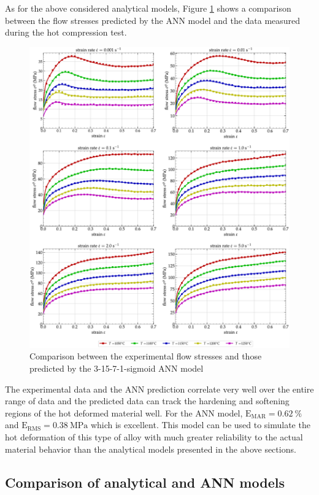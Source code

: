 \documentclass[metals,article,submit,pdftex,moreauthors]{Definitions/mdpi}
\DeclareRobustCommand{\RMSE}{\text{E}_\text{RMS}}
\DeclareRobustCommand{\MARE}{\text{E}_\text{MAR}}
\DeclareRobustCommand{\MPa}{\text{MPa}}
\begin{document}
As for the above considered analytical models, Figure \ref{fig:CompExp-3-15-7-1-sigmoid} shows a comparison between the flow stresses predicted by the ANN model and the data measured during the hot compression test.
\begin{figure}[!ht]
\centering
\includegraphics[width=\columnwidth]
{Figures/CompExp-3-15-7-1-sigmoid}
\caption{Comparison between the experimental flow stresses and those predicted by the 3-15-7-1-sigmoid ANN model}
\label{fig:CompExp-3-15-7-1-sigmoid}
\end{figure}
The experimental data and the ANN prediction correlate very well over the entire range of data and the predicted data can track the hardening and softening regions of the hot deformed material well.
For the ANN model, $\MARE=0.62~\%$ and $\RMSE=0.38~\MPa$ which is excellent.
This model can be used to simulate the hot deformation of this type of alloy with much greater reliability to the actual material behavior than the analytical models presented in the above sections.

\subsection{Comparison of analytical and ANN models\label{sec:Comparison}}
\end{document}
